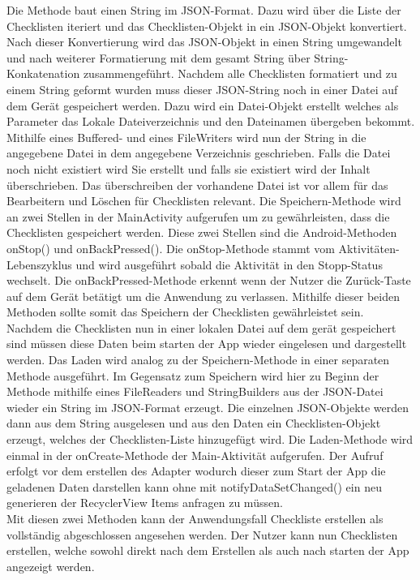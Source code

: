 Die Methode baut einen String im \ac{JSON}-Format. Dazu wird über die Liste der Checklisten iteriert und das Checklisten-Objekt in ein \ac{JSON}-Objekt konvertiert. Nach dieser Konvertierung wird das \ac{JSON}-Objekt in einen String umgewandelt und nach weiterer Formatierung mit dem gesamt String über String-Konkatenation zusammengeführt. Nachdem alle Checklisten formatiert und zu einem String geformt wurden muss dieser \glqq \ac{JSON}-String\grqq{} noch in einer Datei auf dem Gerät gespeichert werden. Dazu wird ein Datei-Objekt erstellt welches als Parameter das Lokale Dateiverzeichnis und den Dateinamen übergeben bekommt. Mithilfe eines Buffered- und eines FileWriters wird nun der String in die angegebene Datei in dem angegebene Verzeichnis geschrieben. Falls die Datei noch nicht existiert wird Sie erstellt und falls sie existiert wird der Inhalt überschrieben. Das überschreiben der vorhandene Datei ist vor allem für das Bearbeitern und Löschen für Checklisten relevant. Die Speichern-Methode wird an zwei Stellen in der MainActivity aufgerufen um zu gewährleisten, dass die Checklisten gespeichert werden. Diese zwei Stellen sind die Android-Methoden onStop() und onBackPressed(). Die onStop-Methode stammt vom Aktivitäten-Lebenszyklus und wird ausgeführt sobald die Aktivität in den Stopp-Status wechselt. Die onBackPressed-Methode erkennt wenn der Nutzer die Zurück-Taste auf dem Gerät betätigt um die Anwendung zu verlassen. Mithilfe dieser beiden Methoden sollte somit das Speichern der Checklisten gewährleistet sein.\\
Nachdem die Checklisten nun in einer lokalen Datei auf dem gerät gespeichert sind müssen diese Daten beim starten der App wieder eingelesen und dargestellt werden. Das Laden wird analog zu der Speichern-Methode in einer separaten Methode ausgeführt. Im Gegensatz zum Speichern wird hier zu Beginn der Methode mithilfe eines FileReaders und StringBuilders aus der \ac{JSON}-Datei wieder ein String im \ac{JSON}-Format erzeugt. Die einzelnen \ac{JSON}-Objekte werden dann aus dem String ausgelesen und aus den Daten ein Checklisten-Objekt erzeugt, welches der Checklisten-Liste hinzugefügt wird. Die Laden-Methode wird einmal in der onCreate-Methode der Main-Aktivität aufgerufen. Der Aufruf erfolgt vor dem erstellen des Adapter wodurch dieser zum Start der App die geladenen Daten darstellen kann ohne mit notifyDataSetChanged() ein neu generieren der RecyclerView Items anfragen zu müssen.\\
Mit diesen zwei Methoden kann der Anwendungsfall \glqq Checkliste erstellen\grqq{} als vollständig abgeschlossen angesehen werden. Der Nutzer kann nun Checklisten erstellen, welche sowohl direkt nach dem Erstellen als auch nach starten der App angezeigt werden.

